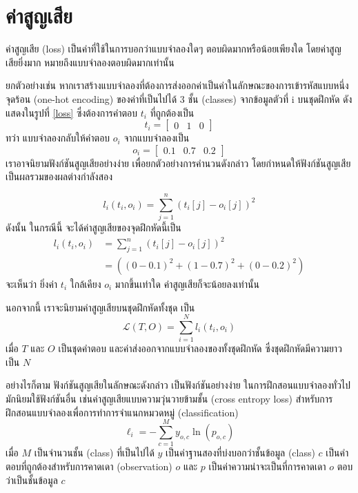 \documentclass{cpereport}
\begin{document}
\section{ค่าสูญเสีย}

ค่าสูญเสีย (loss) เป็นค่าที่ใช้ในการบอกว่าแบบจำลองใดๆ ตอบผิดมากหรือน้อยเพียงใด โดยค่าสูญเสียยิ่งมาก หมายถึงแบบจำลองตอบผิดมากเท่านั้น

ยกตัวอย่างเช่น หากเราสร้างแบบจำลองที่ต้องการส่งออกค่าเป็นค่าในลักษณะของการเข้ารหัสแบบหนึ่งจุดร้อน (one-hot encoding) ของค่าที่เป็นไปได้ 3 ชั้น (classes) จากข้อมูลตัวที่ i บนชุดฝึกหัด ดังแสดงในรูปที่ \ref{loss} ซึ่งต้องการคำตอบ $t_i$ ที่ถูกต้องเป็น
$$t_i = 
\begin{bmatrix}
    0 & 1 & 0
\end{bmatrix}
$$
ทว่า แบบจำลองกลับให้คำตอบ $o_i$ จากแบบจำลองเป็น
$$o_i = 
\begin{bmatrix}
    0.1 & 0.7 & 0.2
\end{bmatrix}
$$
เราอาจนิยามฟังก์ชันสูญเสียอย่างง่าย เพื่อยกตัวอย่างการคำนวนดังกล่าว โดยกำหนดให้ฟังก์ชันสูญเสียเป็นผลรวมของผลต่างกำลังสอง

$$
l_i\left(t_i, o_i\right) = \sum_{j=1}^{n}{\left(t_i[j] - o_i[j]\right)^2}
$$
ดังนั้น ในกรณีนี้ จะได้ค่าสูญเสียของจุดฝึกหัดนี้เป็น
\begin{align*}
    l_i\left(t_i, o_i\right) &= \sum_{j=1}^{n}{\left(t_i[j] - o_i[j]\right)^2}\\
    &= \left((0-0.1)^2 + (1-0.7)^2 + (0-0.2)^2\right)
\end{align*}
จะเห็นว่า ยิ่งค่า $t_i$ ใกล้เคียง $o_i$ มากขึ้นเท่าใด ค่าสูญเสียก็จะน้อยลงเท่านั้น

นอกจากนี้ เราจะนิยามค่าสูญเสียบนชุดฝึกหัดทั้งชุด เป็น
\begin{equation}
\mathscr{L}(T, O) = \sum_{i=1}^{N} l_i(t_i, o_i)
\end{equation}
เมื่อ $T$ และ $O$ เป็นชุดคำตอบ และค่าส่งออกจากแบบจำลองของทั้งชุดฝึกหัด ซึ่งชุดฝึกหัดมีความยาวเป็น $N$

อย่างไรก็ตาม ฟังก์ชันสูญเสียในลักษณะดังกล่าว เป็นฟังก์ชันอย่างง่าย ในการฝึกสอนแบบจำลองทั่วไปมักนิยมใช้ฟังก์ชันอื่น เช่นค่าสูญเสียแบบความวุ่นวายข้ามชั้น (cross entropy loss) สำหรับการฝึกสอนแบบจำลองเพื่อการทำการจำแนกหมวดหมู่ (classification)
$$
    \ell_i = -\sum_{c=1}^{M}y_{o,c}\ln(p_{o,c})
    \label{cross-entropy-loss}
$$
เมื่อ $M$ เป็นจำนวนชั้น (class) ที่เป็นไปได้ $y$ เป็นค่าฐานสองที่บ่งบอกว่าชั้นข้อมูล (class) $c$ เป็นคำตอบที่ถูกต้องสำหรับการคาดเดา (observation) $o$ และ $p$ เป็นค่าความน่าจะเป็นที่การคาดเดา $o$ ตอบว่าเป็นชั้นข้อมูล $c$
\end{document}
